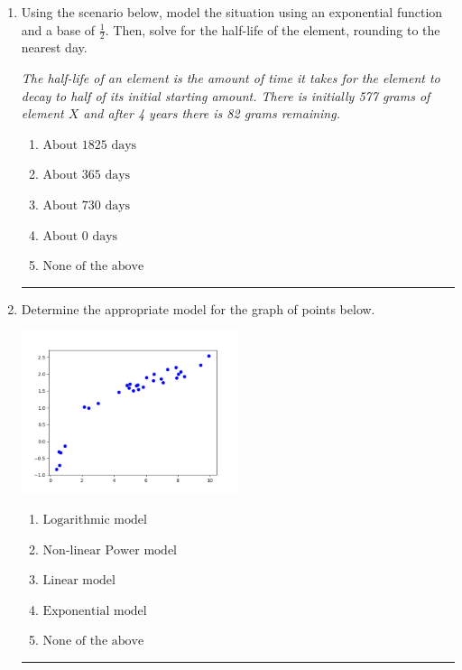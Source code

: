 \documentclass[14pt]{extbook}
\newcommand{\litem}[1]{\item#1\hspace*{-1cm}\rule{\textwidth}{0.4pt}}
\begin{document}
\begin{enumerate}
{\begin{enumerate}[label=\Alph*.]
\end{enumerate} }
\litem{
Using the scenario below, model the situation using an exponential function and a base of $\frac{1}{2}$. Then, solve for the half-life of the element, rounding to the nearest day.
\begin{center}
    \textit{ The half-life of an element is the amount of time it takes for the element to decay to half of its initial starting amount. There is initially 577 grams of element $X$ and after 4 years there is 82 grams remaining. }
\end{center}
\begin{enumerate}[label=\Alph*.]
\item \( \text{About } 1825 \text{ days} \)
\item \( \text{About } 365 \text{ days} \)
\item \( \text{About } 730 \text{ days} \)
\item \( \text{About } 0 \text{ days} \)
\item \( \text{None of the above} \)

\end{enumerate} }
\litem{
Determine the appropriate model for the graph of points below.
\begin{center}
    \includegraphics[width=0.5\textwidth]{../Figures/identifyModelGraph12CopyC.png}
\end{center}
\begin{enumerate}[label=\Alph*.]
\item \( \text{Logarithmic model} \)
\item \( \text{Non-linear Power model} \)
\item \( \text{Linear model} \)
\item \( \text{Exponential model} \)
\item \( \text{None of the above} \)


\end{enumerate}}
\end{enumerate}
\end{document}
